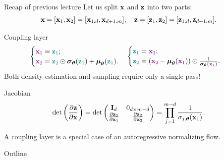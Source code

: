 \documentclass{beamer}
\begin{document}
\begin{frame}{Recap of previous lecture}
	Let us split $\mathbf{x}$ and $\mathbf{z}$ into two parts: 
	\[
	\mathbf{x} = [\mathbf{x}_1, \mathbf{x}_2] = [\mathbf{x}_{1:d}, \mathbf{x}_{d+1:m}]; \quad \mathbf{z} = [\mathbf{z}_1, \mathbf{z}_2] = [\mathbf{z}_{1:d}, \mathbf{z}_{d+1:m}].
	\]
	\vspace{-0.5cm}
	\begin{block}{Coupling layer}
		\vspace{-0.5cm}
		\[
		\begin{cases} {\color{violet}\mathbf{x}_1} = {\color{teal}\mathbf{z}_1}; \\ {\color{violet}\mathbf{x}_2} = {\color{teal}\mathbf{z}_2} \odot \boldsymbol{\sigma}_{\boldsymbol{\theta}}({\color{teal}\mathbf{z}_1}) + \boldsymbol{\mu}_{\boldsymbol{\theta}}({\color{teal}\mathbf{z}_1}).\end{cases}  
		\begin{cases} {\color{teal}\mathbf{z}_1} ={\color{violet} \mathbf{x}_1}; \\ {\color{teal}\mathbf{z}_2} = \left({\color{violet}\mathbf{x}_2} - \boldsymbol{\mu}_{\boldsymbol{\theta}}({\color{violet}\mathbf{x}_1}) \right) \odot \frac{1}{\boldsymbol{\sigma}_{\boldsymbol{\theta}}({\color{violet}\mathbf{x}_1})}.\end{cases}
		\]
		Both density estimation and sampling require only a single pass!
	\end{block}
	\begin{block}{Jacobian}
		\vspace{-0.3cm}
		\[
		\det \left( \frac{\partial \mathbf{z}}{\partial \mathbf{x}} \right) = \det 
		\begin{pmatrix}
			\mathbf{I}_d & 0_{d \times m - d} \\
			\frac{\partial \mathbf{z}_2}{\partial \mathbf{x}_1} & \frac{\partial \mathbf{z}_2}{\partial \mathbf{x}_2}
		\end{pmatrix} = \prod_{j=1}^{m - d} \frac{1}{\sigma_{j, \boldsymbol{\theta}}(\mathbf{x}_1)}.
		\]
	\end{block}
	A coupling layer is a special case of an autoregressive normalizing flow.
	
\end{frame}
\begin{frame}{Outline}
    \tableofcontents
\end{frame}
\end{document}
